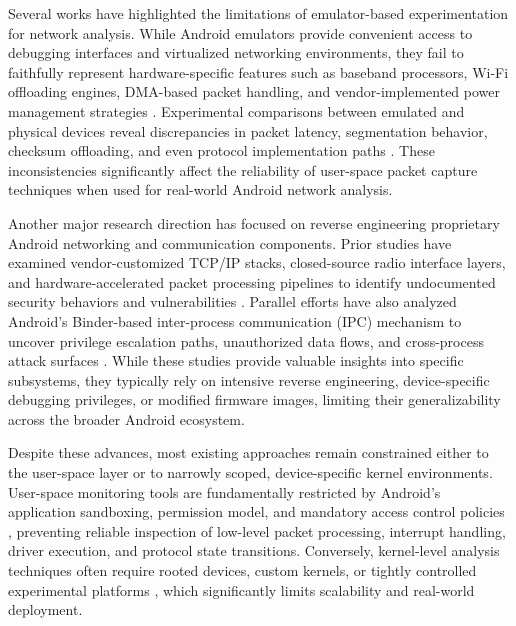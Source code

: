 \documentclass{mnitjaipur}
\begin{document}
Several works have highlighted the limitations of emulator-based experimentation for network analysis. While Android emulators provide convenient access to debugging interfaces and virtualized networking environments, they fail to faithfully represent hardware-specific features such as baseband processors, Wi-Fi offloading engines, DMA-based packet handling, and vendor-implemented power management strategies \cite{tam2017evolution, wei2019emulator}. Experimental comparisons between emulated and physical devices reveal discrepancies in packet latency, segmentation behavior, checksum offloading, and even protocol implementation paths \cite{android_tcpip_stack}. These inconsistencies significantly affect the reliability of user-space packet capture techniques when used for real-world Android network analysis.

Another major research direction has focused on reverse engineering proprietary Android networking and communication components. Prior studies have examined vendor-customized TCP/IP stacks, closed-source radio interface layers, and hardware-accelerated packet processing pipelines to identify undocumented security behaviors and vulnerabilities \cite{android_kernel_security, baseband_security}. Parallel efforts have also analyzed Android’s Binder-based inter-process communication (IPC) mechanism to uncover privilege escalation paths, unauthorized data flows, and cross-process attack surfaces \cite{binder_ipc, binder_security}. While these studies provide valuable insights into specific subsystems, they typically rely on intensive reverse engineering, device-specific debugging privileges, or modified firmware images, limiting their generalizability across the broader Android ecosystem.

Despite these advances, most existing approaches remain constrained either to the user-space layer or to narrowly scoped, device-specific kernel environments. User-space monitoring tools are fundamentally restricted by Android’s application sandboxing, permission model, and mandatory access control policies \cite{mayrhofer2019_platform_security}, preventing reliable inspection of low-level packet processing, interrupt handling, driver execution, and protocol state transitions. Conversely, kernel-level analysis techniques often require rooted devices, custom kernels, or tightly controlled experimental platforms \cite{possemato2021_trustbutverify}, which significantly limits scalability and real-world deployment.
\end{document}
